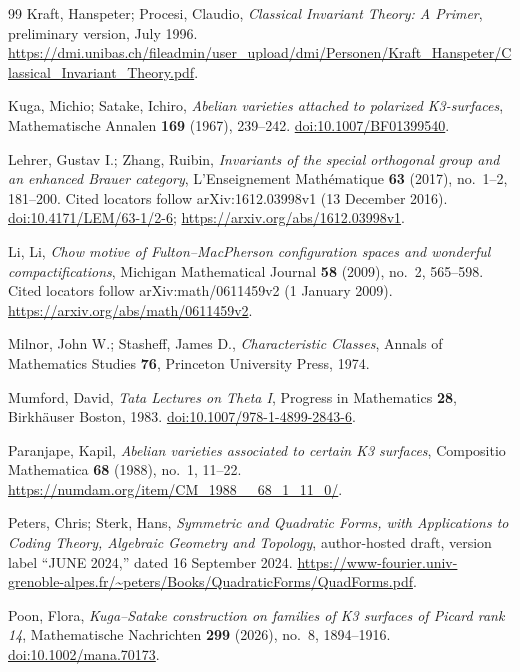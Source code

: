 \documentclass[11pt]{amsart}
\theoremstyle{definition}
\theoremstyle{remark}
\numberwithin{equation}{section}
\begin{document}
\begin{thebibliography}{99}
Kraft, Hanspeter; Procesi, Claudio, \emph{Classical Invariant Theory: A Primer}, preliminary version, July 1996. \url{https://dmi.unibas.ch/fileadmin/user_upload/dmi/Personen/Kraft_Hanspeter/Classical_Invariant_Theory.pdf}.

Kuga, Michio; Satake, Ichiro, \emph{Abelian varieties attached to polarized {K3}-surfaces}, Mathematische Annalen \textbf{169} (1967), 239--242. \href{https://doi.org/10.1007/BF01399540}{doi:10.1007/BF01399540}.

Lehrer, Gustav I.; Zhang, Ruibin, \emph{Invariants of the special orthogonal group and an enhanced {Brauer} category}, L'Enseignement Math{\'e}matique \textbf{63} (2017), no.~1--2, 181--200. Cited locators follow arXiv:1612.03998v1 (13 December 2016). \href{https://doi.org/10.4171/LEM/63-1/2-6}{doi:10.4171/LEM/63-1/2-6}; \url{https://arxiv.org/abs/1612.03998v1}.

Li, Li, \emph{Chow motive of Fulton--MacPherson configuration spaces and wonderful compactifications}, Michigan Mathematical Journal \textbf{58} (2009), no.~2, 565--598. Cited locators follow arXiv:math/0611459v2 (1 January 2009). \url{https://arxiv.org/abs/math/0611459v2}.

Milnor, John W.; Stasheff, James D., \emph{Characteristic Classes}, Annals of Mathematics Studies \textbf{76}, Princeton University Press, 1974.

Mumford, David, \emph{Tata Lectures on Theta {I}}, Progress in Mathematics \textbf{28}, Birkh{\"a}user Boston, 1983. \href{https://doi.org/10.1007/978-1-4899-2843-6}{doi:10.1007/978-1-4899-2843-6}.

Paranjape, Kapil, \emph{Abelian varieties associated to certain {K3} surfaces}, Compositio Mathematica \textbf{68} (1988), no.~1, 11--22. \url{https://numdam.org/item/CM_1988__68_1_11_0/}.

Peters, Chris; Sterk, Hans, \emph{Symmetric and Quadratic Forms, with Applications to Coding Theory, Algebraic Geometry and Topology}, author-hosted draft, version label ``JUNE 2024,'' dated 16 September 2024. \url{https://www-fourier.univ-grenoble-alpes.fr/~peters/Books/QuadraticForms/QuadForms.pdf}.

Poon, Flora, \emph{{Kuga--Satake} construction on families of {K3} surfaces of {Picard} rank 14}, Mathematische Nachrichten \textbf{299} (2026), no.~8, 1894--1916. \href{https://doi.org/10.1002/mana.70173}{doi:10.1002/mana.70173}.


\end{thebibliography}
\end{document}
